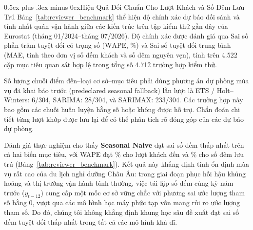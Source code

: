 \documentclass[10pt,journal,compsoc]{IEEEtran}
\makeatletter
\def\subsection{\@startsection{subsection}{2}{\z@}{-1.8ex plus -0.6ex minus -0.3ex}%
{0.5ex plus .3ex minus 0ex}{\normalfont\normalsize\rmfamily\bfseries}}
\makeatother
\begin{document}
\subsection{Hiệu Quả Đối Chuẩn Cho Lượt Khách và Số Đêm Lưu Trú}
\label{sec:matched_benchmarks}
Bảng~\ref{tab:reviewer_benchmark} thể hiện độ chính xác dự báo đối sánh và tính nhất quán vận hành giữa các kiến trúc trên tập kiểm thử gần đây của Eurostat (tháng 01/2024--tháng 07/2026). Độ chính xác được đánh giá qua Sai số phần trăm tuyệt đối có trọng số ($\text{WAPE}$, \%) và Sai số tuyệt đối trung bình (MAE, tính theo đơn vị số đếm khách và số đêm nguyên vẹn), tính trên 4.522 cặp mục tiêu quan sát hợp lệ trong tổng số 4.712 trường hợp kiểm thử.


Số lượng chuỗi điểm đến--loại cơ sở--mục tiêu phải dùng phương án dự phòng mùa vụ đã khai báo trước (predeclared seasonal fallback) lần lượt là ETS / Holt--Winters: 6/304, SARIMA: 28/304, và SARIMAX: 233/304. Các trường hợp này bao gồm các chuỗi huấn luyện hằng số hoặc không được hỗ trợ. Chẩn đoán chi tiết từng lượt khớp được lưu lại để có thể phân tích rõ đóng góp của các dự báo dự phòng.

Đánh giá thực nghiệm cho thấy \textbf{Seasonal Naive} đạt sai số đếm thấp nhất trên cả hai biến mục tiêu, với WAPE đạt \ReviewerSNaiveArrivalWAPE{}\% cho lượt khách đến và \ReviewerSNaiveNightsWAPE{}\% cho số đêm lưu trú (Bảng~\ref{tab:reviewer_benchmark}). Kết quả này khẳng định tính ổn định mùa vụ rất cao của du lịch nghỉ dưỡng Châu Âu: trong giai đoạn phục hồi hậu khủng hoảng và thị trường vận hành bình thường, việc tái lặp số đếm cùng kỳ năm trước ($y_{t-12}$) cung cấp một mốc cơ sở vững chắc với phương sai ước lượng tham số bằng 0, vượt qua các mô hình học máy phức tạp vốn mang rủi ro ước lượng tham số. Do đó, chúng tôi không khẳng định khung học sâu đề xuất đạt sai số đếm tuyệt đối thấp nhất trong tất cả các mô hình khả dĩ.
\end{document}
